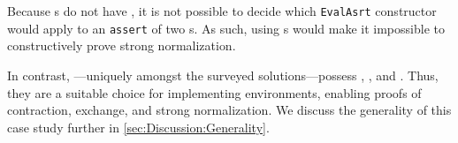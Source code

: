 Because \fpf{}s do not have \EqDec, it is not possible to decide which \texttt{EvalAsrt} constructor would
apply to an \texttt{assert} of two \fpf{}s. As such, using \fpf{}s would make it impossible to constructively prove strong normalization.

In contrast, \dds---uniquely amongst the surveyed solutions---possess \SemTot, \SemInj, and \EqDec.
%
Thus, they are a suitable choice for implementing environments, enabling proofs of contraction, exchange, and strong normalization.
%
We discuss the generality of this case study further in \autoref{sec:Discussion:Generality}.
